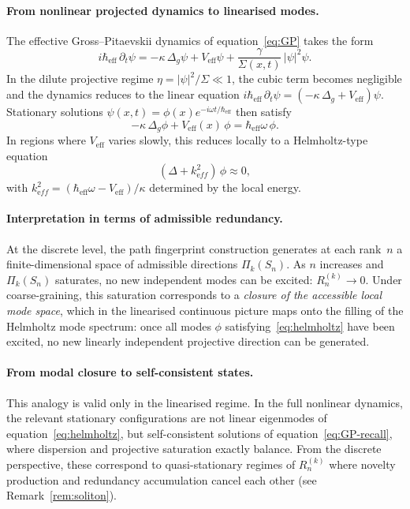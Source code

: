 \documentclass[11pt,a4paper]{article}
\theoremstyle{definition}
\theoremstyle{remark}
\newcommand{\heff}{\hbar_{\mathrm{eff}}}
\begin{document}
    \paragraph{From nonlinear projected dynamics to linearised modes.}
      The effective Gross--Pitaevskii dynamics of equation~\eqref{eq:GP} takes the form
      \begin{equation}
        \label{eq:GP-recall}
        i\heff\,\partial_t\psi
        = -\kappa\,\Delta_g\psi + V_{\mathrm{eff}}\psi
        + \frac{\gamma}{\Sigma(x,t)}\,|\psi|^2\psi.
      \end{equation}
      In the dilute projective regime $\eta = |\psi|^2/\Sigma \ll 1$, the cubic term
      becomes negligible and the dynamics reduces to the linear equation
      $i\heff\,\partial_t\psi = (-\kappa\,\Delta_g + V_{\mathrm{eff}})\psi$.
      Stationary solutions $\psi(x,t) = \phi(x)e^{-i\omega t/\heff}$ then satisfy
      \begin{equation}
        \label{eq:linear-stationary}
        -\kappa\,\Delta_g\phi + V_{\mathrm{eff}}(x)\,\phi = \heff\omega\,\phi.
      \end{equation}
      In regions where $V_{\mathrm{eff}}$ varies slowly, this reduces locally to a
      Helmholtz-type equation
      \begin{equation}
        \label{eq:helmholtz}
        (\Delta + k_{\mathrm eff}^2)\,\phi \approx 0,
      \end{equation}
      with $k_{\mathrm eff}^2 = (\heff\omega - V_{\mathrm{eff}})/\kappa$ determined by the local energy.

    \paragraph{Interpretation in terms of admissible redundancy.}
      At the discrete level, the path fingerprint construction generates at each rank~$n$
      a finite-dimensional space of admissible directions $\Pi_k(S_n)$.
      As $n$ increases and $\Pi_k(S_n)$ saturates, no new independent modes can be excited:
      $R_n^{(k)} \to 0$.
      Under coarse-graining, this saturation corresponds to a \emph{closure of the accessible
  local mode space}, which in the linearised continuous picture maps onto the filling of
      the Helmholtz mode spectrum: once all modes $\phi$ satisfying~\eqref{eq:helmholtz}
      have been excited, no new linearly independent projective direction can be generated.

    \paragraph{From modal closure to self-consistent states.}
      This analogy is valid only in the linearised regime.
      In the full nonlinear dynamics, the relevant stationary configurations are not linear
      eigenmodes of equation~\eqref{eq:helmholtz}, but self-consistent solutions of
      equation~\eqref{eq:GP-recall}, where dispersion and projective saturation exactly balance.
      From the discrete perspective, these correspond to quasi-stationary regimes of
      $R_n^{(k)}$ where novelty production and redundancy accumulation cancel each other
      (see Remark~\ref{rem:soliton}).
\end{document}
